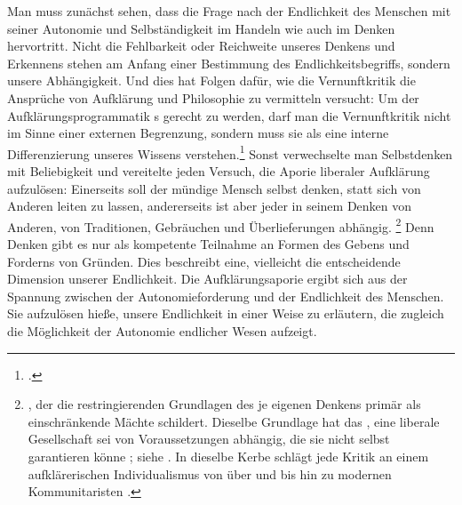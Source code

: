 Man muss zunächst sehen, dass die Frage nach der Endlichkeit des Menschen mit
seiner Autonomie und Selbständigkeit im Handeln wie auch im Denken hervortritt.
Nicht die Fehlbarkeit oder Reichweite unseres Denkens und Erkennens
stehen am Anfang einer Bestimmung des Endlichkeitsbegriffs, sondern unsere
Abhängigkeit. Und dies hat Folgen dafür, wie die Vernunftkritik die Ansprüche
von Aufklärung und Philosophie zu vermitteln versucht:
Um der Aufklärungsprogrammatik s gerecht zu werden, darf
man die Vernunftkritik nicht im Sinne einer externen Begrenzung, sondern muss
sie als eine interne Differenzierung unseres Wissens
verstehen.\footnote{\cite[Zur Relevanz und Aktualität einer solchen Position
siehe][8--11]{Abel:KnowledgeResearch2012}.} Sonst verwechselte man Selbstdenken
mit Beliebigkeit und vereitelte jeden Versuch, die Aporie liberaler Aufklärung
aufzulösen: Einerseits soll der mündige Mensch selbst denken, statt sich von
Anderen leiten zu lassen, andererseits ist aber jeder in seinem Denken von
Anderen, von Traditionen, Gebräuchen und Überlieferungen abhängig.%
\footnote{\cite[Vgl.][]{Foucault:DieOrdnungdesDiskurses1998}, der die restringierenden
Grundlagen des je eigenen Denkens primär als einschränkende Mächte schildert.
Dieselbe Grundlage hat das , eine liberale
Gesellschaft sei von Voraussetzungen abhängig, die sie nicht selbst garantieren
könne
\parencite[vgl.][60]{Boeckenfoerde:DieEntstehungdesStaatesalsVorgangderSaekularisation1976};
siehe \cite{Habermas:VorpolitischeGrundlagendesdemokratischenRechtsstaates?2005,Habermas:DialektikderSaekularisierung2005,Habermas:VorpolitischeGrundlagendesdemokratischenRechtsstaates?2005}.
In dieselbe Kerbe schlägt jede Kritik an einem aufklärerischen Individualismus
von  über  und
 bis hin zu modernen Kommunitaristen 
\parencite[siehe
bspw.][]{MacIntyre:WhoseJustice?WhichRationality?1988,Taylor:SourcesoftheSelf1989}.}
Denn Denken gibt es nur als kompetente Teilnahme an Formen des Gebens und
Forderns von Gründen. Dies beschreibt eine, vielleicht die entscheidende
Dimension unserer Endlichkeit. Die Aufklärungsaporie ergibt sich aus der
Spannung zwischen der Autonomieforderung und der Endlichkeit des Menschen. Sie
aufzulösen hieße, unsere Endlichkeit in einer Weise zu erläutern, die zugleich
die Möglichkeit der Autonomie endlicher Wesen aufzeigt.

